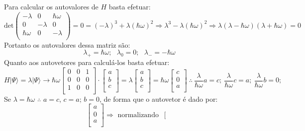 \begin{enumerate}[start=1,label={\bfseries Q\arabic*.}]
\resposta Para calcular os autovalores de $H$ basta efetuar:
$$ \mathrm{det }
\left(
  \begin{array}{ccc}
    -\lambda & 0 & \hbar \omega \\
    0 & -\lambda & 0 \\
    \hbar \omega & 0 & -\lambda \\
  \end{array}
\right) = 0 = (- \lambda)^{3} + \lambda (\hbar \omega)^{2} \Rightarrow  \lambda^{3} - \lambda (\hbar \omega)^{2} \Rightarrow \lambda(\lambda - \hbar \omega)(\lambda + \hbar \omega) = 0
$$
Portanto os autovalores dessa matriz são:
$$
\lambda_{+} = \hbar \omega; \ \ \ \lambda_{0} = 0; \ \ \ \lambda_{-} = - \hbar \omega
$$
Quanto aos autovetores para calculá-los basta efetuar:
$$
H | \Psi \rangle = \lambda | \Psi \rangle \rightarrow \hbar \omega
\left[
    \begin{array}{ccc}
     0 & 0 & 1 \\
     0 & 0 & 0 \\
     1 & 0 & 0 \\
    \end{array}
\right] \cdot
\left[
  \begin{array}{c}
    a \\
    b \\
    c \\
  \end{array}
\right] = \lambda
\left[
  \begin{array}{c}
    a \\
    b \\
    c \\
  \end{array}
\right] = \hbar \omega
\left[
  \begin{array}{c}
    c \\
    0 \\
    a \\
  \end{array}
\right] \ \therefore \ \frac{\lambda}{\hbar \omega} a = c; \ \frac{\lambda}{\hbar \omega} c = a; \ \frac{\lambda}{\hbar \omega} b = 0;
$$
Se $\lambda = \hbar \omega$ $\therefore$ $a=c$, $c=a$; $b=0$, de forma que o autovetor é dado por:
$$
\left[
  \begin{array}{c}
    a \\
    0 \\
    a \\
  \end{array}
\right] \Rightarrow \mbox{ normalizando } \
%
\left[
  \begin{array}{c}

\end{array}$$
\end{enumerate}
